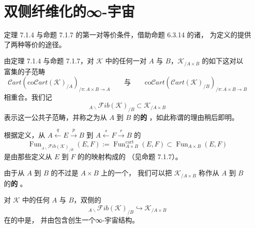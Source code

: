 \providecommand{\Cart}{\mathcal{C}art}
\providecommand{\coCart}{\mathrm{co}\mathcal{C}\mathit{art}}   %
\providecommand{\Fib}{\mathcal{F}ib}
\providecommand{\Fun}{\operatorname{Fun}}
\providecommand{\dashdownarrow}{\rotatebox[origin=c]{270}{$\dashrightarrow$}}   %

\section{双侧纤维化的∞-宇宙}\label{sec:two-sided-fibration-cosmos}

定理 7.1.4 与命题 7.1.7 的第一对等价条件，借助命题 6.3.14 的诸\trInfinityCosmos{}，%
为定义\trTwoSidedFibration{}的\trInfinityCosmos{}提供了两种等价的途径。

\begin{definition}[双侧纤维化的∞-宇宙]\label{def:two-sided-fibration-cosmos}
由定理 7.1.4 与命题 7.1.7，对\trInfinityCosmos{} $\mathcal{K}$ 中的任何一对%
\trInfinityCategory{} $A$ 与 $B$，$\mathcal{K}_{/A\times B}$ 的如下这对以%
\trQuasiCategory{}富集的子范畴
\begin{equation*}
\Cart(\coCart(\mathcal{K})_{/A})_{/\pi\colon A\times B\to A}
\qquad\text{与}\qquad
\coCart(\Cart(\mathcal{K})_{/B})_{/\pi\colon A\times B\to B}
\end{equation*}
相重合。我们记
\begin{equation*}
{}_{A\backslash}\Fib(\mathcal{K})_{/B}\subset\mathcal{K}_{/A\times B}
\end{equation*}
表示这一公共子范畴，并称之为从 $A$ 到 $B$ 的\textbf{\trTwoSidedFibration{}的%
\trInfinityCosmos}，如此称谓的理由稍后即明。

根据定义，从 $A\xleftarrow{q}E\xrightarrow{p}B$ 到
$A\xleftarrow{s}F\xrightarrow{r}B$ 的\trFunctorSpace
\begin{equation*}
\Fun_{{}_{A\backslash}\Fib(\mathcal{K})_{/B}}(E,F)
:=\Fun^{\mathrm{cart}}_{A\times B}(E,F)\subset\Fun_{A\times B}(E,F)
\end{equation*}
是由那些定义从 $E$ 到 $F$ 的\trCartesianFunctor{}的\trSpan{}映射构成的\trQuasiCategory%
（见命题 7.1.7）。

由于从 $A$ 到 $B$ 的\trTwoSidedIsofibration{}不过是 $A\times B$ 上的一个\trIsofibration{}，%
我们可以把 $\mathcal{K}_{/A\times B}$ 称作从 $A$ 到 $B$ 的\textbf{\trTwoSidedIsofibration{}的%
\trInfinityCosmos}。
\end{definition}

\begin{proposition}\label{prop:two-sided-fibration-cosmos-embedded}
对\trInfinityCosmos{} $\mathcal{K}$ 中的任何\trInfinityCategory{} $A$ 与
$B$，双侧\trFibration{}的\trInfinityCosmos{}
\[
{}_{A\backslash}\Fib(\mathcal{K})_{/B}\hookrightarrow\mathcal{K}_{/A\times B}
\]
在\trIsofibration{}的\trInfinityCosmos{}中是\trCosmologicallyEmbedded{}，
并由包含创生一个∞-宇宙结构。
\end{proposition}

